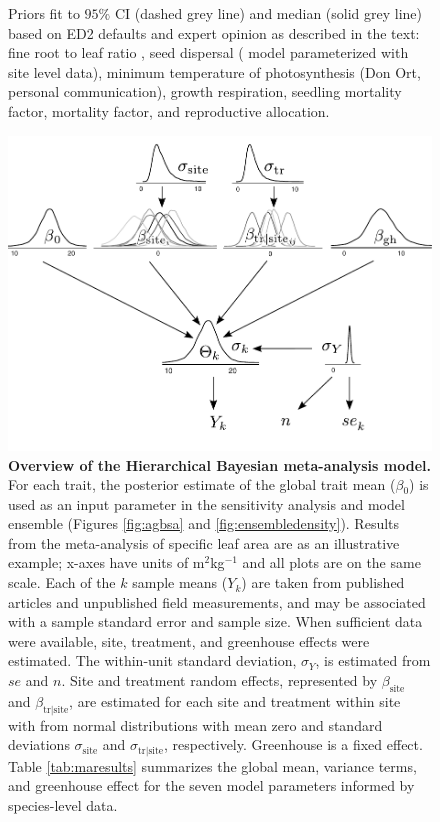 \documentclass[12pt]{article}
\begin{document}
\begin{flushleft}
\begin{spacing}{1.9}
\begin{figure}
\begin{centering}
{      Priors fit to $95\%$ CI (dashed grey line) and median (solid grey line) based on ED2 defaults and expert opinion as described in the text: fine root to leaf ratio \citep{chapin2002pte}, seed dispersal (\citet{ernst1992pda} model parameterized with site level data), minimum temperature of photosynthesis (Don Ort, personal communication), growth respiration, seedling mortality factor, mortality factor, and reproductive allocation.}
    \label{fig:priors}
  \end{centering}
\end{figure}

\begin{figure}[p]
\caption%
{{\bf Overview of the Hierarchical Bayesian meta-analysis model.} 
  For each trait, the posterior estimate of the global trait mean ($\beta{_0}$) is used as an input parameter in the sensitivity analysis and model ensemble (Figures \ref{fig:agbsa} and \ref{fig:ensembledensity}). 
  Results from the meta-analysis of specific leaf area are as an illustrative example; x-axes have units of m$^2$kg$^{-1}$ and all plots are on the same scale.
 Each of the $k$ sample means ($Y_k$) are taken from published articles and unpublished field measurements, and may be associated with a sample standard error and sample size. 
 When sufficient data were available, site, treatment, and greenhouse effects were estimated.
 The within-unit standard deviation, $\sigma_Y$, is estimated from $se$ and $n$.
 Site and treatment random effects, represented by $\beta_{\text{site}}$ and $\beta_{\text{tr|site}}$, are estimated for each site and treatment within site with from normal distributions with mean zero and standard deviations $\sigma_{\text{site}}$ and $\sigma_{\text{tr|site}}$, respectively. 
 Greenhouse is a fixed effect.
 Table \ref{tab:maresults} summarizes the global mean, variance terms, and greenhouse effect for the seven model parameters informed by species-level data.
  }
\begin{center}
\includegraphics{mamodel.pdf}
\end{center}
\label{fig:ma}
\end{figure}



\end{spacing}
\end{flushleft}
\end{document}
